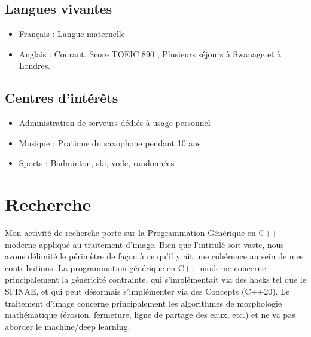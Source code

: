 \documentclass[11pt,a4paper,sans]{article} %
\begin{document}

\subsection{Langues vivantes}

\begin{itemize}
  \item Français : Langue maternelle
  \item Anglais : Courant. Score TOEIC 890 ; Plusieurs séjours à Swanage et à Londres.
\end{itemize}


\subsection{Centres d'intérêts}

\begin{itemize}
  \item Administration de serveurs dédiés à usage personnel
  \item Musique : Pratique du saxophone pendant 10 ans
  \item Sports : Badminton, ski, voile, randonnées
\end{itemize}

\clearpage

\section{Recherche}

Mon activité de recherche porte sur la Programmation Générique en C++ moderne appliqué au traitement d'image. Bien que
l'intitulé soit vaste, nous avons délimité le périmètre de façon à ce qu'il y ait une cohérence au sein de mes
contributions. La programmation générique en C++ moderne concerne principalement la généricité contrainte, qui
s'implémentait via des hacks tel que le SFINAE, et qui peut désormais s'implémenter via des Concepts (C++20). Le
traitement d'image concerne principalement les algorithmes de morphologie mathématique (érosion, fermeture, ligne de
partage des eaux, etc.) et ne va pas aborder le machine/deep learning.
\end{document}
